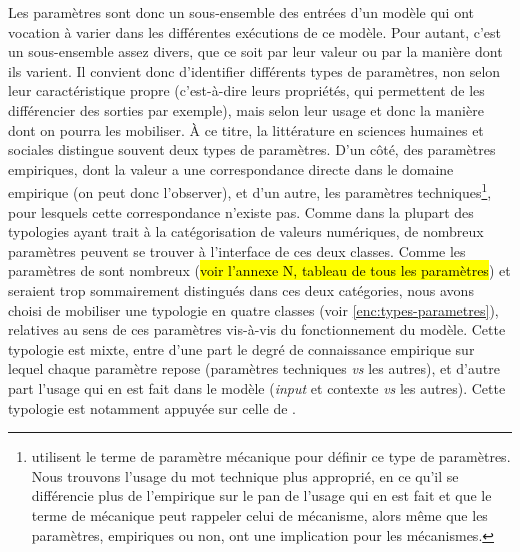Les paramètres sont donc un sous-ensemble des entrées d'un modèle qui ont vocation à varier dans les différentes exécutions de ce modèle.
Pour autant, c'est un sous-ensemble assez divers, que ce soit par leur valeur ou par la manière dont ils varient.
Il convient donc d'identifier différents types de paramètres, non selon leur caractéristique propre (c'est-à-dire leurs propriétés, qui permettent de les différencier des sorties par exemple), mais selon leur usage et donc la manière dont on pourra les mobiliser.
À ce titre, la littérature en sciences humaines et sociales
distingue souvent deux types de paramètres.
D'un côté, des paramètres empiriques, dont la valeur a une correspondance directe dans le domaine empirique (on peut donc l'observer), et d'un autre, les paramètres techniques\footnote{
		\textcite{mathian_formalisation_2015} utilisent le terme de paramètre mécanique pour définir ce type de paramètres.
		Nous trouvons l'usage du mot \og technique\fg{} plus approprié, en ce qu'il se différencie plus de l'empirique sur le pan de l'usage qui en est fait et que le terme de \og mécanique\fg{} peut rappeler celui de mécanisme, alors même que les paramètres, empiriques ou non, ont une implication pour les mécanismes.
}, pour lesquels cette correspondance n'existe pas.
Comme dans la plupart des typologies ayant trait à la catégorisation de valeurs numériques, de nombreux paramètres peuvent se trouver à l'interface de ces deux classes.
Comme les paramètres de \simfeodal{} sont nombreux (\hl{voir l'annexe N, tableau de tous les paramètres}) et seraient trop sommairement distingués dans ces deux catégories, nous avons choisi de mobiliser une typologie en quatre classes (voir \cref{enc:types-parametres}), relatives au sens de ces paramètres vis-à-vis du fonctionnement du modèle.
Cette typologie est mixte, entre d'une part le degré de connaissance empirique sur lequel chaque paramètre repose (paramètres techniques \textit{vs} les autres), et d'autre part l'usage qui en est fait dans le modèle (\textit{input} et contexte \textit{vs} les autres).
Cette typologie est notamment appuyée sur celle de \textcite[45]{tannier_analyse_2017}.

